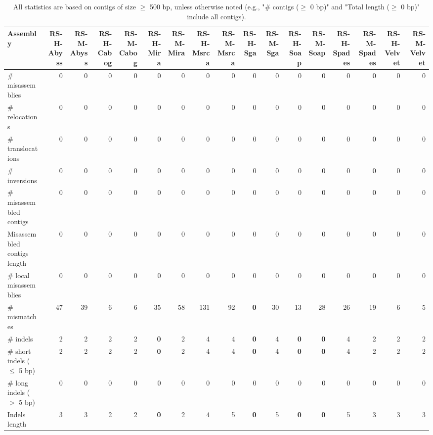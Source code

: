 \documentclass[12pt,a4paper]{article}
\begin{document}
\begin{table}[ht]
\begin{center}
\caption{All statistics are based on contigs of size $\geq$ 500 bp, unless otherwise noted (e.g., "\# contigs ($\geq$ 0 bp)" and "Total length ($\geq$ 0 bp)" include all contigs).}
\begin{tabular}{|l*{16}{|r}|}
\hline
Assembly & RS-H-Abyss & RS-M-Abyss & RS-H-Cabog & RS-M-Cabog & RS-H-Mira & RS-M-Mira & RS-H-Msrca & RS-M-Msrca & RS-H-Sga & RS-M-Sga & RS-H-Soap & RS-M-Soap & RS-H-Spades & RS-M-Spades & RS-H-Velvet & RS-M-Velvet \\ \hline
\# misassemblies & 0 & 0 & 0 & 0 & 0 & 0 & 0 & 0 & 0 & 0 & 0 & 0 & 0 & 0 & 0 & 0 \\ \hline
\hspace{5mm}\# relocations & 0 & 0 & 0 & 0 & 0 & 0 & 0 & 0 & 0 & 0 & 0 & 0 & 0 & 0 & 0 & 0 \\ \hline
\hspace{5mm}\# translocations & 0 & 0 & 0 & 0 & 0 & 0 & 0 & 0 & 0 & 0 & 0 & 0 & 0 & 0 & 0 & 0 \\ \hline
\hspace{5mm}\# inversions & 0 & 0 & 0 & 0 & 0 & 0 & 0 & 0 & 0 & 0 & 0 & 0 & 0 & 0 & 0 & 0 \\ \hline
\# misassembled contigs & 0 & 0 & 0 & 0 & 0 & 0 & 0 & 0 & 0 & 0 & 0 & 0 & 0 & 0 & 0 & 0 \\ \hline
Misassembled contigs length & 0 & 0 & 0 & 0 & 0 & 0 & 0 & 0 & 0 & 0 & 0 & 0 & 0 & 0 & 0 & 0 \\ \hline
\# local misassemblies & 0 & 0 & 0 & 0 & 0 & 0 & 0 & 0 & 0 & 0 & 0 & 0 & 0 & 0 & 0 & 0 \\ \hline
\# mismatches & 47 & 39 & 6 & 6 & 35 & 58 & 131 & 92 & {\bf 0} & 30 & 13 & 28 & 26 & 19 & 6 & 5 \\ \hline
\# indels & 2 & 2 & 2 & 2 & {\bf 0} & 2 & 4 & 4 & {\bf 0} & 4 & {\bf 0} & {\bf 0} & 4 & 2 & 2 & 2 \\ \hline
\hspace{5mm}\# short indels ($\leq$ 5 bp) & 2 & 2 & 2 & 2 & {\bf 0} & 2 & 4 & 4 & {\bf 0} & 4 & {\bf 0} & {\bf 0} & 4 & 2 & 2 & 2 \\ \hline
\hspace{5mm}\# long indels ($>$ 5 bp) & 0 & 0 & 0 & 0 & 0 & 0 & 0 & 0 & 0 & 0 & 0 & 0 & 0 & 0 & 0 & 0 \\ \hline
Indels length & 3 & 3 & 2 & 2 & {\bf 0} & 2 & 4 & 5 & {\bf 0} & 5 & {\bf 0} & {\bf 0} & 5 & 3 & 3 & 3 \\ \hline
\end{tabular}
\end{center}
\end{table}
\end{document}
